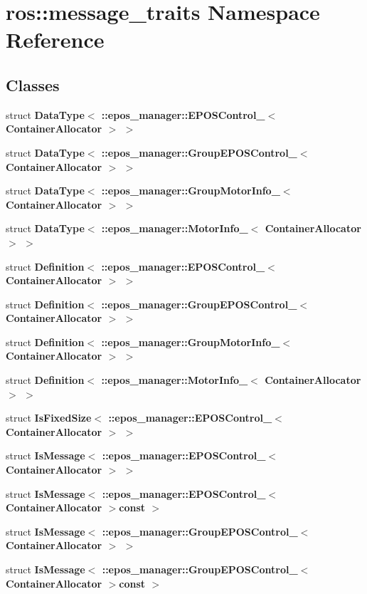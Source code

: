 \section{ros\-:\-:message\-\_\-traits \-Namespace \-Reference}
\label{namespaceros_1_1message__traits}
\subsection*{\-Classes}
\begin{DoxyCompactItemize}
\item 
struct {\bf \-Data\-Type$<$ \-::epos\-\_\-manager\-::\-E\-P\-O\-S\-Control\-\_\-$<$ Container\-Allocator $>$ $>$}
\item 
struct {\bf \-Data\-Type$<$ \-::epos\-\_\-manager\-::\-Group\-E\-P\-O\-S\-Control\-\_\-$<$ Container\-Allocator $>$ $>$}
\item 
struct {\bf \-Data\-Type$<$ \-::epos\-\_\-manager\-::\-Group\-Motor\-Info\-\_\-$<$ Container\-Allocator $>$ $>$}
\item 
struct {\bf \-Data\-Type$<$ \-::epos\-\_\-manager\-::\-Motor\-Info\-\_\-$<$ Container\-Allocator $>$ $>$}
\item 
struct {\bf \-Definition$<$ \-::epos\-\_\-manager\-::\-E\-P\-O\-S\-Control\-\_\-$<$ Container\-Allocator $>$ $>$}
\item 
struct {\bf \-Definition$<$ \-::epos\-\_\-manager\-::\-Group\-E\-P\-O\-S\-Control\-\_\-$<$ Container\-Allocator $>$ $>$}
\item 
struct {\bf \-Definition$<$ \-::epos\-\_\-manager\-::\-Group\-Motor\-Info\-\_\-$<$ Container\-Allocator $>$ $>$}
\item 
struct {\bf \-Definition$<$ \-::epos\-\_\-manager\-::\-Motor\-Info\-\_\-$<$ Container\-Allocator $>$ $>$}
\item 
struct {\bf \-Is\-Fixed\-Size$<$ \-::epos\-\_\-manager\-::\-E\-P\-O\-S\-Control\-\_\-$<$ Container\-Allocator $>$ $>$}
\item 
struct {\bf \-Is\-Message$<$ \-::epos\-\_\-manager\-::\-E\-P\-O\-S\-Control\-\_\-$<$ Container\-Allocator $>$ $>$}
\item 
struct {\bf \-Is\-Message$<$ \-::epos\-\_\-manager\-::\-E\-P\-O\-S\-Control\-\_\-$<$ Container\-Allocator $>$const  $>$}
\item 
struct {\bf \-Is\-Message$<$ \-::epos\-\_\-manager\-::\-Group\-E\-P\-O\-S\-Control\-\_\-$<$ Container\-Allocator $>$ $>$}
\item 
struct {\bf \-Is\-Message$<$ \-::epos\-\_\-manager\-::\-Group\-E\-P\-O\-S\-Control\-\_\-$<$ Container\-Allocator $>$const  $>$}

\end{DoxyCompactItemize}
